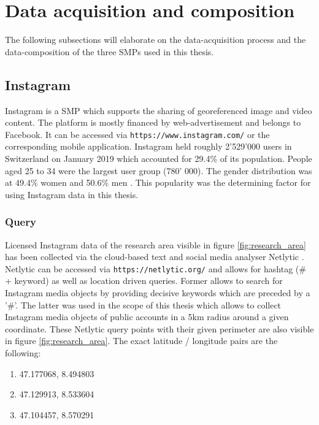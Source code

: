 \section{Data acquisition and composition} \label{data_acquisition}
The following subsections will elaborate on the data-acquisition process and the data-composition of the three SMPs used in this thesis. 

\subsection{Instagram} \label{instagram}
Instagram is a SMP which supports the sharing of georeferenced image and video content. The platform is mostly financed by web-advertisement and belongs to Facebook. It can be accessed via \texttt{https://www.instagram.com/} or the corresponding mobile application.
Instagram held roughly 2'529'000 users in Switzerland on January 2019 which accounted for 29.4\% of its population. People aged 25 to 34 were the largest user group (780' 000). The gender distribution was at 49.4\% women and 50.6\% men \parencite{2013}. This popularity was the determining factor for using Instagram data in this thesis.\\

\subsubsection{Query} \label{netlytic}
Licensed Instagram data of the research area visible in figure \ref{fig:research_area} has been collected via the cloud-based text and social media analyser Netlytic \parencite{Gruzd2016}. Netlytic can be accessed via \texttt{https://netlytic.org/} and allows for hashtag (\# + keyword) as well as location driven queries. Former allows to search for Instagram media objects by providing decisive keywords which are preceded by a '\#'. The latter was used in the scope of this thesis which allows to collect Instagram media objects of public accounts in a 5km radius around a given coordinate. These Netlytic query points with their given perimeter are also visible in figure \ref{fig:research_area}. The exact latitude / longitude pairs are the following:\\
\begin{enumerate}
  \item 47.177068, 8.494803
  \item 47.129913, 8.533604
  \item 47.104457, 8.570291
\end{enumerate}

